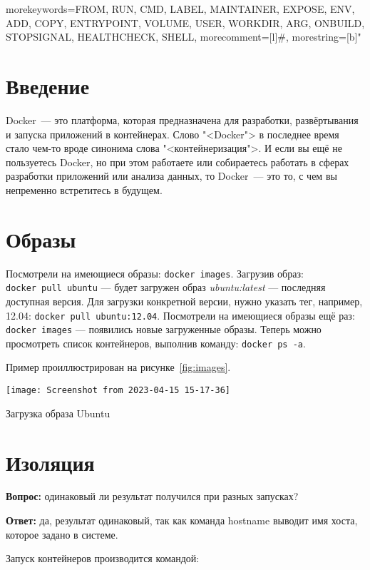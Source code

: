 \graphicspath{{./fourth/img/}}
{
  morekeywords={FROM, RUN, CMD, LABEL, MAINTAINER, EXPOSE, ENV, ADD, COPY,
    ENTRYPOINT, VOLUME, USER, WORKDIR, ARG, ONBUILD, STOPSIGNAL, HEALTHCHECK,
    SHELL},
  morecomment=[l]{\#},
  morestring=[b]"
}

\section*{\LARGE Введение}
Docker~--- это платформа, которая предназначена для разработки,
развёртывания и запуска приложений в контейнерах.
Слово "<Docker"> в последнее время стало чем-то вроде синонима слова
"<контейнеризация">. И если вы ещё не пользуетесь Docker, но при этом
работаете или собираетесь работать в сферах разработки приложений или
анализа данных, то Docker~--- это то, с чем вы непременно встретитесь
в будущем.

\clearpage

\section{Образы}
Посмотрели на имеющиеся образы: \texttt{docker~images}.
Загрузив образ: \texttt{docker~pull~ubuntu} --- будет загружен образ
\textit{ubuntu:latest} --- последняя доступная версия.
Для загрузки конкретной версии, нужно указать тег, например, 12.04:
\texttt{docker~pull~ubuntu:12.04}. Посмотрели на имеющиеся образы ещё раз:
\texttt{docker~images} --- появились новые загруженные
образы. Теперь можно просмотреть список контейнеров,
выполнив команду: \texttt{docker~ps~-a}.\par
Пример проиллюстрирован на рисунке~\ref{fig:images}.

\begin{image}
	\texttt{[image: Screenshot from 2023-04-15 15-17-36]}
	\caption{Загрузка образа Ubuntu}
	\label{fig:images}
\end{image}

\section{Изоляция}
\textbf{Вопрос:} одинаковый ли результат получился при разных запусках?\par
\textbf{Ответ:} да, результат одинаковый, так как команда hostname выводит имя
хоста, которое задано в системе.\par
Запуск контейнеров производится командой:

